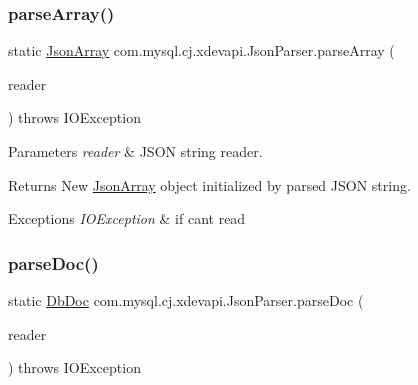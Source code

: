 \subsubsection{\texorpdfstring{parse\+Array()}{parseArray()}}
{\footnotesize\ttfamily static \mbox{\hyperlink{classcom_1_1mysql_1_1cj_1_1xdevapi_1_1_json_array}{Json\+Array}} com.\+mysql.\+cj.\+xdevapi.\+Json\+Parser.\+parse\+Array (\begin{DoxyParamCaption}\item[{String\+Reader}]{reader }\end{DoxyParamCaption}) throws I\+O\+Exception\hspace{0.3cm}{\ttfamily [static]}}


\begin{DoxyParams}{Parameters}
{\em reader} & J\+S\+ON string reader. \\
\hline
\end{DoxyParams}
\begin{DoxyReturn}{Returns}
New \mbox{\hyperlink{classcom_1_1mysql_1_1cj_1_1xdevapi_1_1_json_array}{Json\+Array}} object initialized by parsed J\+S\+ON string. 
\end{DoxyReturn}

\begin{DoxyExceptions}{Exceptions}
{\em I\+O\+Exception} & if can\textquotesingle{}t read \\
\hline
\end{DoxyExceptions}
\mbox{\label{classcom_1_1mysql_1_1cj_1_1xdevapi_1_1_json_parser_a09f9af593473756e34e7e87fb3022cc4}} 
\subsubsection{\texorpdfstring{parse\+Doc()}{parseDoc()}}
{\footnotesize\ttfamily static \mbox{\hyperlink{interfacecom_1_1mysql_1_1cj_1_1xdevapi_1_1_db_doc}{Db\+Doc}} com.\+mysql.\+cj.\+xdevapi.\+Json\+Parser.\+parse\+Doc (\begin{DoxyParamCaption}\item[{String\+Reader}]{reader }\end{DoxyParamCaption}) throws I\+O\+Exception\hspace{0.3cm}{\ttfamily [static]}}


